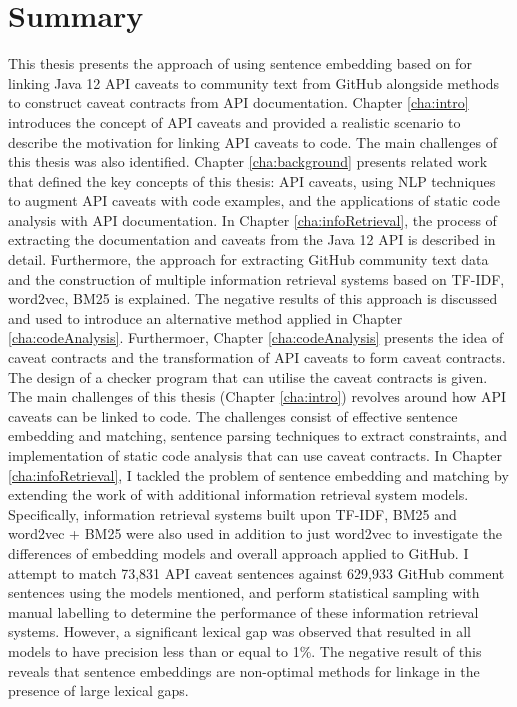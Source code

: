 \section{Summary}
\label{sec:summary}
This thesis presents the approach of using sentence embedding based on \cite{jiamou} for linking Java 12 API caveats to community text from GitHub alongside methods to construct caveat contracts from API documentation. Chapter \ref{cha:intro} introduces the concept of API caveats and provided a realistic scenario to describe the motivation for linking API caveats to code. The main challenges of this thesis was also identified. Chapter \ref{cha:background} presents related work that defined the key concepts of this thesis: API caveats, using NLP techniques to augment API caveats with code examples, and the applications of static code analysis with API documentation. In Chapter \ref{cha:infoRetrieval}, the process of extracting the documentation and caveats from the Java 12 API is described in detail. Furthermore, the approach for extracting GitHub community text data and the construction of multiple information retrieval systems based on TF-IDF, word2vec, BM25 is explained. The negative results of this approach is discussed and used to introduce an alternative method applied in Chapter \ref{cha:codeAnalysis}. Furthermoer, Chapter \ref{cha:codeAnalysis} presents the idea of caveat contracts and the transformation of API caveats to form caveat contracts. The design of a checker program that can utilise the caveat contracts is given.\\
The main challenges of this thesis (Chapter \ref{cha:intro}) revolves around how API caveats can be linked to code. The challenges consist of effective sentence embedding and matching, sentence parsing techniques to extract constraints, and implementation of static code analysis that can use caveat contracts. In Chapter \ref{cha:infoRetrieval}, I tackled the problem of sentence embedding and matching by extending the work of \cite{jiamou} with additional information retrieval system models. Specifically, information retrieval systems built upon TF-IDF, BM25 and word2vec + BM25 were also used in addition to just word2vec to investigate the differences of embedding models and overall approach applied to GitHub. I attempt to match 73,831 API caveat sentences against 629,933 GitHub comment sentences using the models mentioned, and perform statistical sampling with manual labelling to determine the performance of these information retrieval systems. However, a significant lexical gap was observed that resulted in all models to have precision less than or equal to 1\%. The negative result of this reveals that sentence embeddings are non-optimal methods for linkage in the presence of large lexical gaps. \\
